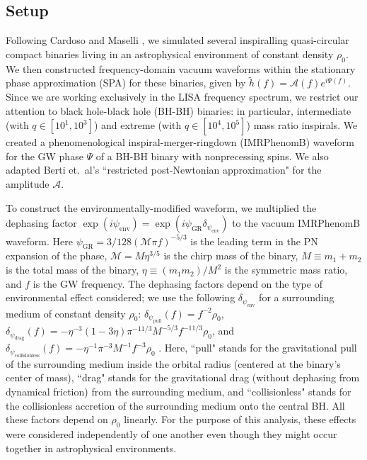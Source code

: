 \documentclass[10pt,a4paper,twoside]{article}
\newcommand{\dephase}{\exp(i\psi_{\text{env}})}
\begin{document}
\subsection{Setup}
Following Cardoso and Maselli \cite{Cardoso2020}, we simulated several inspiralling quasi-circular compact binaries living in an astrophysical environment of constant density $\rho_0$. We then constructed frequency-domain vacuum waveforms within the stationary phase approximation (SPA) for these binaries, given by $\tilde{h}(f) = \mathcal{A}(f) e^{i\Psi(f)}$. Since we are working exclusively in the LISA frequency spectrum, we restrict our attention to black hole-black hole (BH-BH) binaries: in particular, intermediate (with $q \in [10^1, 10^3]$) and extreme (with $q \in [10^4, 10^5]$) mass ratio inspirals. We created a phenomenological inspiral-merger-ringdown (IMRPhenomB) waveform \cite{Ajith2011} for the GW phase $\Psi$ of a BH-BH binary with nonprecessing spins. We also adapted Berti et.~al's ``restricted post-Newtonian approximation" \cite{Berti2005} for the amplitude $\mathcal{A}$. 

To construct the environmentally-modified waveform, we multiplied the dephasing factor $\dephase = \exp (i\psi_{\text{GR}} \delta_{\psi_{\text{env}}})$ to the vacuum IMRPhenomB waveform. Here $\psi_{\text{GR}} = 3/128 (\mathcal{M} \pi f)^{-5/3}$ is the leading term in the PN expansion of the phase, $\mathcal{M} = M \eta^{3/5}$ is the chirp mass of the binary, $M \equiv m_1 + m_2$ is the total mass of the binary, $\eta \equiv (m_1 m_2)/M^2$ is the symmetric mass ratio, and $f$ is the GW frequency. The dephasing factors depend on the type of environmental effect considered; we use the following $\delta_{\psi_{\text{env}}}$ for a surrounding medium of constant density $\rho_0$: $\delta_{\psi_{\text{pull}}}(f) = f^{-2} \rho_0$, $\delta_{\psi_{\text{drag}}}(f) = -\eta^{-3} (1-3\eta) \pi^{-11/3} M^{-5/3} f^{-11/3} \rho_0$, and $\delta_{\psi_{\text{collisionless}}}(f) = -\eta^{-1}\pi^{-3} M^{-1} f^{-3} \rho_0$ \cite{Cardoso2020}. Here, ``pull" stands for the gravitational pull of the surrounding medium inside the orbital radius (centered at the binary's center of mass), ``drag" stands for the gravitational drag (without dephasing from dynamical friction) from the surrounding medium, and ``collisionless" stands for the collisionless accretion of the surrounding medium onto the central BH. All these factors depend on $\rho_0$ linearly. For the purpose of this analysis, these effects were considered independently of one another even though they might occur together in astrophysical environments.
\end{document}
